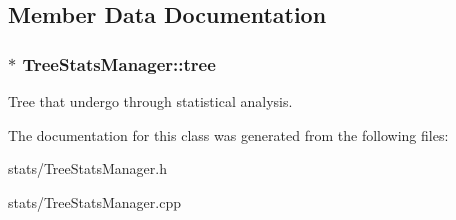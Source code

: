 \subsection{Member Data Documentation}
\subsubsection[{\texorpdfstring{tree}{tree}}]{$\ast$ Tree\+Stats\+Manager\+::tree\hspace{0.3cm}{\ttfamily [private]}}\hypertarget{class_tree_stats_manager_a87781acaeb7b0eab470e6678c97b9ec5}{}\label{class_tree_stats_manager_a87781acaeb7b0eab470e6678c97b9ec5}
Tree that undergo through statistical analysis. 

The documentation for this class was generated from the following files\+:\begin{DoxyCompactItemize}
\item 
stats/Tree\+Stats\+Manager.\+h\item 
stats/Tree\+Stats\+Manager.\+cpp\end{DoxyCompactItemize}
